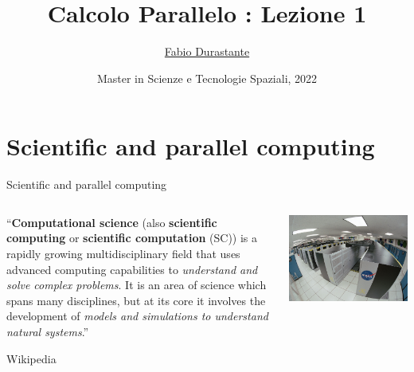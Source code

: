 \documentclass[xcolor={svgnames,usenames}]{beamer}
\title[Calcolo Parallelo]{Calcolo Parallelo : Lezione 1}
\author[F. Durastante]{
    \href{mailto:fabio.durastante@nunipi.it}{Fabio Durastante}
}
\institute{Dipartimento di Matematica, Università di Pisa}
\date[Maggio 2021]{Master in Scienze e Tecnologie Spaziali, 2022}
\begin{document}
\begin{frame}
	\titlepage
\end{frame}

\section[Outline]{}
\frame[allowframebreaks]{\tableofcontents}

\section{Scientific and parallel computing}

\begin{frame}{Scientific and parallel computing}

\begin{columns}
	\begin{column}{0.6\textwidth}
		\begin{center}
		``\textbf{Computational science} (also \textbf{scientific computing} or \textbf{scientific computation} (SC)) is a rapidly growing multidisciplinary field that uses advanced computing capabilities to \emph{understand and solve complex problems}. It is an area of science which spans many disciplines, but at its core it involves the development of \emph{models and simulations to understand natural systems}.''
		\end{center}
		
		\flushright Wikipedia
	\end{column}
	\begin{column}{0.4\textwidth}
		\centering
		\includegraphics[width=\columnwidth]{nasasuperpc.jpg}
		
	\end{column}
\end{columns}

\end{frame}
\end{document}
